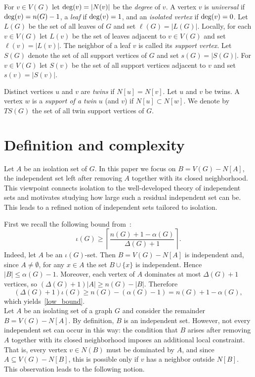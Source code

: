 \documentclass[11pt]{article}
\newcommand{\io}{\iota}
\newcommand{\al}{\alpha}
\begin{document}
For $v\in V(G)$ let ${\rm deg}(v)=|N(v)|$ be the \emph{degree} of $v$. A vertex $v$ is \emph{universal} if ${\rm deg}(v)=n(G)-1$,  a \emph{leaf} if ${\rm deg}(v)=1$, and an \emph{isolated vertex} if ${\rm deg}(v)=0$. Let $L(G)$ be the set of all leaves of $G$ and set $\ell(G)=|L(G)|$. Locally, for each $v\in V(G)$ let $L(v)$ be the set of leaves adjacent to $v\in V(G)$ and set $\ell(v)=|L(v)|$. The neighbor of a leaf $v$ is called its \emph{support vertex}. Let $S(G)$ denote the set of all support vertices of $G$ and set $s(G)=|S(G)|$. For $v\in V(G)$ let  $S(v)$ be the set of all support vertices adjacent to $v$ and set $s(v)=|S(v)|$.

Distinct vertices $u$ and $v$ are \emph{twins} if $N[u]=N[v]$. Let $u$ and $v$ be twins. A vertex $w$ is a \emph{support of a twin} $u$ (and $v$) if $N[u]\subset N[w]$. We denote by $TS(G)$ the set of all twin support vertices of $G$. 



\section{Definition and complexity}
\label{com}

Let $A$ be an isolation set of $G$. In this paper we focus on $B=V(G)-N[A]$, the independent set left after removing $A$ together with
its closed neighborhood. This viewpoint connects isolation to the well-developed theory of independent sets and motivates studying how large such a residual independent set can be. This leads to a refined notion of independent sets tailored to isolation.

First we recall the following bound from~\cite{caro}:
\begin{equation}\label{low_bound}
\io(G)\geq \left\lceil\frac{n(G)+1-\al(G)}{\Delta(G)+1}\right\rceil.
\end{equation}
Indeed, let $A$ be an $\io(G)$-set. Then $B=V(G)-N[A]$ is independent and,
since $A\neq\emptyset$, for any $x\in A$ the set $B\cup\{x\}$ is independent. Hence $|B|\le \al(G)-1$. Moreover, each vertex of $A$
dominates at most $\Delta(G)+1$ vertices, so $(\Delta(G)+1)|A|\ge n(G)-|B|$. Therefore
$$(\Delta(G)+1)\io(G)\ge n(G)-(\al(G)-1)=n(G)+1-\al(G),$$
which yields~\eqref{low_bound}. \\

Let $A$ be an isolating set of a graph $G$ and consider the remainder $B=V(G)-N[A]$.
By definition, $B$ is an independent set. However, not every independent set can occur
in this way: the condition that $B$ arises after removing $A$ together with its closed
neighborhood imposes an additional local constraint. That is, every vertex $v\in N(B)$
must be dominated by $A$, and since $A\subseteq V(G)-N[B]$, this is possible
only if $v$ has a neighbor outside $N[B]$. This observation leads to the following notion.
\end{document}
